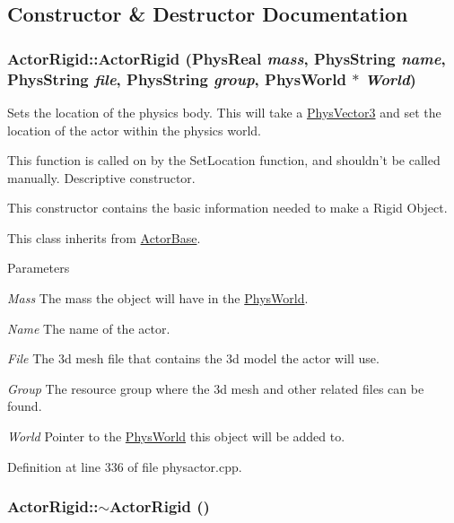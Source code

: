 \subsection{Constructor \& Destructor Documentation}
\hypertarget{classActorRigid_a8313ce86811d7233b8672f562306976c}{
\subsubsection[{ActorRigid}]{\setlength{\rightskip}{0pt plus 5cm}ActorRigid::ActorRigid (PhysReal {\em mass}, \/  PhysString {\em name}, \/  PhysString {\em file}, \/  PhysString {\em group}, \/  {\bf PhysWorld} $\ast$ {\em World})}}
\label{d5/d10/classActorRigid_a8313ce86811d7233b8672f562306976c}


Sets the location of the physics body. This will take a \hyperlink{classPhysVector3}{PhysVector3} and set the location of the actor within the physics world. \par
 This function is called on by the SetLocation function, and shouldn't be called manually. Descriptive constructor.

This constructor contains the basic information needed to make a Rigid Object. \par
 This class inherits from \hyperlink{classActorBase}{ActorBase}. 
\begin{DoxyParams}{Parameters}
\item[{\em Mass}]The mass the object will have in the \hyperlink{classPhysWorld}{PhysWorld}. \item[{\em Name}]The name of the actor. \item[{\em File}]The 3d mesh file that contains the 3d model the actor will use. \item[{\em Group}]The resource group where the 3d mesh and other related files can be found. \item[{\em World}]Pointer to the \hyperlink{classPhysWorld}{PhysWorld} this object will be added to. \end{DoxyParams}


Definition at line 336 of file physactor.cpp.\hypertarget{classActorRigid_a36b9eb18fc9e83769a48eb1c34312889}{
\subsubsection[{$\sim$ActorRigid}]{\setlength{\rightskip}{0pt plus 5cm}ActorRigid::$\sim$ActorRigid ()}}
\label{d5/d10/classActorRigid_a36b9eb18fc9e83769a48eb1c34312889}


